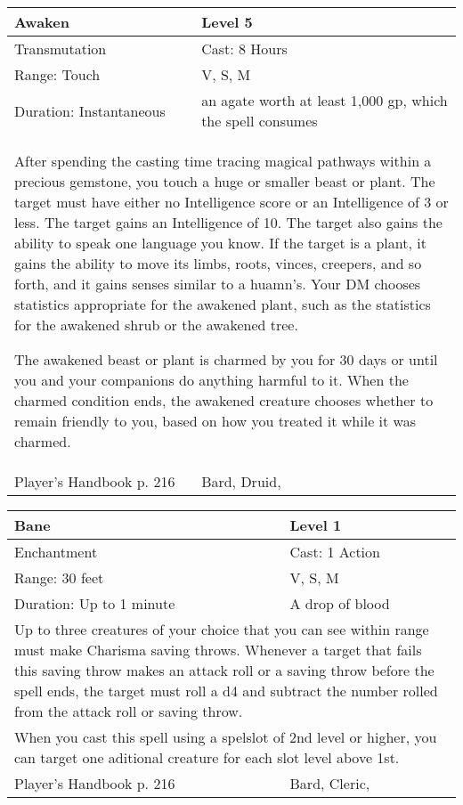 \documentclass[11pt]{report}
\begin{document}
\begin{table}[H]
	\begin{tabular}{||p{6cm}|p{6cm}||}
		\hline\hline
		\bf{Awaken} & Level 5\\ \hline
		Transmutation & Cast: 8 Hours\\ \hline
		Range: Touch & V, S, M\\ \hline
		Duration: Instantaneous & an agate worth at least 1,000 gp, which the spell consumes\\ \hline
		\multicolumn{2}{||p{12cm}||}{After spending the casting time tracing magical pathways within a precious gemstone, you touch a huge or smaller beast or plant. 
The target must have either no Intelligence score or an Intelligence of 3 or less. The target gains an Intelligence of 10. The target also gains the ability to speak one language you know. If the target is a plant, it gains the ability to move its limbs, roots, vinces, creepers, and so forth, and it gains senses similar to a huamn’s. Your DM chooses statistics appropriate for the awakened plant, such as the statistics for the awakened shrub or the awakened tree. 

The awakened beast or plant is charmed by you for 30 days or until you and your companions do anything harmful to it. When the charmed condition ends, the awakened creature chooses whether to remain friendly to you, based on how you treated it while it was charmed.}\\ \hline
Player's Handbook p. 216 & Bard, Druid, \\ \hline\hline
	\end{tabular}
\end{table}

\begin{table}[H]
	\begin{tabular}{||p{6cm}|p{6cm}||}
		\hline\hline
		\bf{Bane} & Level 1\\ \hline
		Enchantment & Cast: 1 Action\\ \hline
		Range: 30 feet & V, S, M\\ \hline
		Duration: Up to 1 minute & A drop of blood\\ \hline
		\multicolumn{2}{||p{12cm}||}{Up to three creatures of your choice that you can see within range must make Charisma saving throws. Whenever a target that fails this saving throw makes an attack roll or a saving throw before the spell ends, the target must roll a d4 and subtract the number rolled from the attack roll or saving throw.}\\ \hline
		\multicolumn{2}{||p{12cm}||}{When you cast this spell using a spelslot of 2nd level or higher, you can target one aditional creature for each slot level above 1st.}\\ \hline
Player's Handbook p. 216 & Bard, Cleric, \\ \hline\hline
	\end{tabular}
\end{table}
\end{document}
